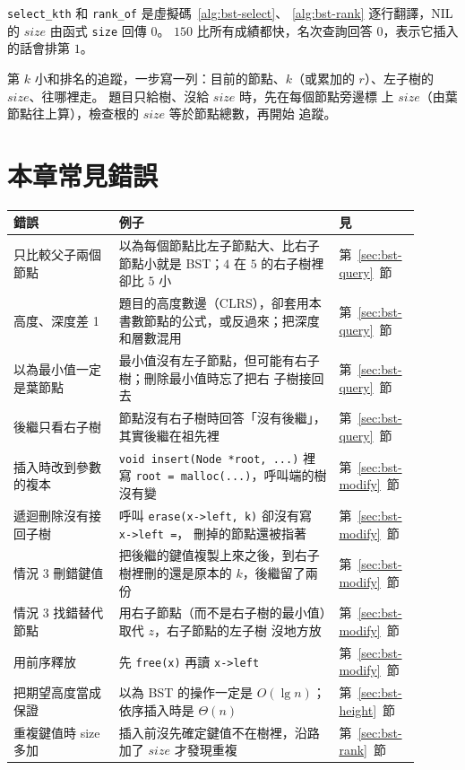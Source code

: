 \texttt{select\_kth} 和 \texttt{rank\_of} 是虛擬碼~\ref{alg:bst-select}、
\ref{alg:bst-rank} 逐行翻譯，NIL 的 $\mathit{size}$ 由函式 \texttt{size} 回傳 $0$。
$150$ 比所有成績都快，名次查詢回答 $0$，表示它插入的話會排第 $1$。

\begin{examnote}
第 $k$ 小和排名的追蹤，一步寫一列：目前的節點、$k$（或累加的 $r$）、左子樹的
$\mathit{size}$、往哪裡走。 題目只給樹、沒給 $\mathit{size}$ 時，先在每個節點旁邊標
上 $\mathit{size}$（由葉節點往上算），檢查根的 $\mathit{size}$ 等於節點總數，再開始
追蹤。
\end{examnote}

\section{本章常見錯誤}
\label{sec:bst-pitfalls}

\begin{center}
\begin{tabular}{p{0.24\linewidth}p{0.50\linewidth}p{0.16\linewidth}}
\toprule
錯誤 & 例子 & 見 \\
\midrule
只比較父子兩個節點 & 以為每個節點比左子節點大、比右子節點小就是 BST；$4$ 在 $5$
的右子樹裡卻比 $5$ 小 & 第~\ref{sec:bst-query}~節 \\
高度、深度差 1 & 題目的高度數邊（CLRS），卻套用本書數節點的公式，或反過來；把深度
和層數混用 &
第~\ref{sec:bst-query}~節 \\
以為最小值一定是葉節點 & 最小值沒有左子節點，但可能有右子樹；刪除最小值時忘了把右
子樹接回去 & 第~\ref{sec:bst-query}~節 \\
後繼只看右子樹 & 節點沒有右子樹時回答「沒有後繼」，其實後繼在祖先裡 &
第~\ref{sec:bst-query}~節 \\
插入時改到參數的複本 & \texttt{void insert(Node *root, ...)} 裡寫 \texttt{root =
malloc(...)}，呼叫端的樹沒有變 & 第~\ref{sec:bst-modify}~節 \\
遞迴刪除沒有接回子樹 & 呼叫 \texttt{erase(x->left, k)} 卻沒有寫 \texttt{x->left =}，
刪掉的節點還被指著 & 第~\ref{sec:bst-modify}~節 \\
情況 3 刪錯鍵值 & 把後繼的鍵值複製上來之後，到右子樹裡刪的還是原本的 $k$，後繼留了兩
份 & 第~\ref{sec:bst-modify}~節 \\
情況 3 找錯替代節點 & 用右子節點（而不是右子樹的最小值）取代 $z$，右子節點的左子樹
沒地方放 & 第~\ref{sec:bst-modify}~節 \\
用前序釋放 & 先 \texttt{free(x)} 再讀 \texttt{x->left} & 第~\ref{sec:bst-modify}~節 \\
把期望高度當成保證 & 以為 BST 的操作一定是 $O(\lg n)$；依序插入時是 $\Theta(n)$ &
第~\ref{sec:bst-height}~節 \\
重複鍵值時 size 多加 & 插入前沒先確定鍵值不在樹裡，沿路加了 $\mathit{size}$ 才發現重複
& 第~\ref{sec:bst-rank}~節 \\
\bottomrule
\end{tabular}
\end{center}

